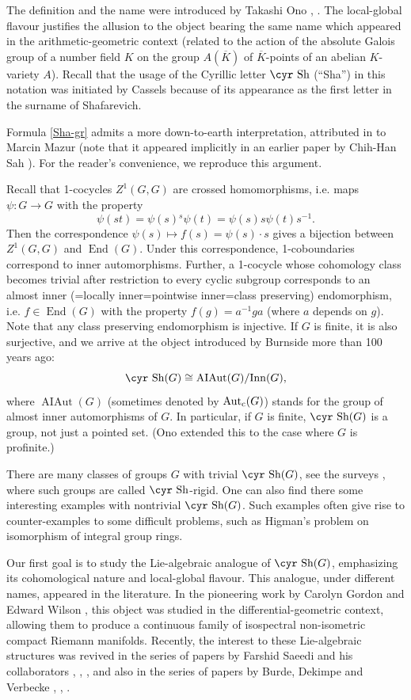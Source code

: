 \documentclass[11pt,reqno]{amsart}
\numberwithin{equation}{section}
\theoremstyle{definition}
\newcommand{\Inner}{{\operatorname{ Inn}}}
\newcommand{\AIAut}{{\operatorname{ AIAut}}}
\newcommand{\Autc}{{\operatorname{ Aut_{\text{\rm{c}}}}}}
\newcommand{\End}{{\operatorname{ End}}}
\def\Sha{\text{\cyr Sh}}
\begin{document}
The definition and the name were introduced by Takashi Ono \cite{On1}, \cite{On2}.
The local-global flavour justifies the allusion to the object bearing the
same name which appeared in the arithmetic-geometric context (related to the
action of the absolute Galois group of a number field $K$ on the group $A(\overline K)$
of $\overline K$-points of an abelian $K$-variety $A$).
Recall that the usage of the Cyrillic letter  $\Sha$ (``Sha'') in this notation was initiated by Cassels
because of its appearance as the first letter in the surname of Shafarevich.

Formula \eqref{Sha-gr} admits a more down-to-earth interpretation, attributed in \cite{On2}
to Marcin Mazur (note that it appeared implicitly in an earlier paper by Chih-Han Sah \cite{Sah}).
For the reader's convenience, we reproduce this argument.

Recall that 1-cocycles $Z^1(G,G)$ are crossed homomorphisms, i.e.
maps $\psi\colon G\to G$ with the property
$$
\psi (st) = \psi (s) {}^s\psi (t) = \psi (s) s \psi (t) s^{-1}.
$$
Then the correspondence $\psi(s)\mapsto f(s) = \psi(s) \cdot s$ gives a bijection between
$Z^1(G,G)$ and $\End(G)$.
Under this correspondence, 1-coboundaries correspond to inner automorphisms.
Further, a 1-cocycle whose cohomology class becomes trivial after restriction to every cyclic
subgroup corresponds to an almost inner (=locally inner=pointwise inner=class preserving) endomorphism,
i.e. $f\in\End(G)$ with the property $f(g)=a^{-1}ga$ (where $a$ depends on $g$).
Note that any class preserving endomorphism is injective. If $G$ is finite, it
is also surjective, and we arrive at the object introduced by Burnside \cite{Bur1} more than 100 years ago:
$$\Sha (G)\cong \AIAut(G)/\Inner(G),
$$
where $\AIAut(G)$ (sometimes denoted by $\Autc(G)$) stands for the group of almost inner automorphisms of $G$.
In particular, if $G$ is finite, $\Sha (G)$ is a group, not just a pointed set.
(Ono \cite{On2} extended this to the case where $G$ is profinite.)

There are many classes of groups $G$ with trivial $\Sha (G)$, see the surveys \cite{Ku1}, \cite{Ya}
where such groups are called $\Sha$-rigid. One can also find there some interesting examples
with nontrivial $\Sha (G)$. Such examples often give rise to counter-examples to some difficult problems,
such as Higman's problem on isomorphism of integral group rings.

Our first goal is to study the Lie-algebraic analogue of $\Sha (G)$, emphasizing its cohomological
nature and local-global flavour. This analogue, under different names, appeared in the literature.
In the pioneering work by Carolyn Gordon and Edward Wilson \cite{GW}, this object was studied
in the differential-geometric context, allowing them to produce a continuous family of isospectral non-isometric
compact Riemann manifolds. Recently, the interest to these Lie-algebraic structures was revived in the series of papers
by Farshid Saeedi and his collaborators \cite{SMSB}, \cite{SMS1}, \cite{SMS2}, and also in the series of papers by
Burde, Dekimpe and Verbecke \cite{BDV1}, \cite{BDV2}, \cite{BDV3}.
\end{document}
